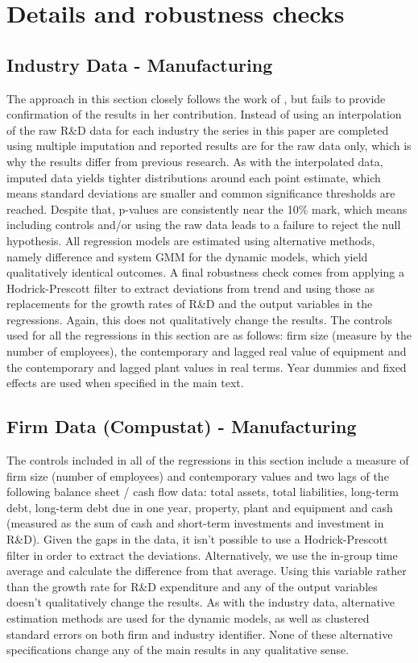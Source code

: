 \documentclass{_latex/house}
\begin{document}
\section{Details and robustness checks}
\subsection{Industry Data - Manufacturing}
The approach in this section closely follows the work of \cite{RePEc:tpr:restat:v:93:y:2011:i:2:p:542-553}, but fails to provide confirmation of the results in her contribution. Instead of using an interpolation of the raw R\&D data for each industry the series in this paper are completed using multiple imputation and reported results are for the raw data only, which is why the results differ from previous research. As with the interpolated data, imputed data yields tighter distributions around each point estimate, which means standard deviations are smaller and common significance thresholds are reached. Despite that, p-values are consistently near the 10\% mark, which means including controls and/or using the raw data leads to a failure to reject the null hypothesis. All regression models are estimated using alternative methods, namely difference and system GMM for the dynamic models, which yield qualitatively identical outcomes. A final robustness check comes from applying a Hodrick-Prescott filter to extract deviations from trend and using those as replacements for the growth rates of R\&D and the output variables in the regressions. Again, this does not qualitatively change the results. The controls used for all the regressions in this section are as follows: firm size (measure by the number of employees), the contemporary and lagged real value of equipment and the contemporary and lagged plant values in real terms. Year dummies and fixed effects are used when specified in the main text.
\subsection{Firm Data (Compustat) - Manufacturing}
The controls included in all of the regressions in this section include a measure of firm size (number of employees) and contemporary values and two lags of the following balance sheet / cash flow data: total assets, total liabilities, long-term debt, long-term debt due in one year, property, plant and equipment and cash (measured as the sum of cash and short-term investments and investment in R\&D). Given the gaps in the data, it isn't possible to use a Hodrick-Prescott filter in order to extract the deviations. Alternatively, we use the in-group time average and calculate the difference from that average. Using this variable rather than the growth rate for R\&D expenditure and any of the output variables doesn't qualitatively change the results. As with the industry data, alternative estimation methods are used for the dynamic models, as well as clustered standard errors on both firm and industry identifier. None of these alternative specifications change any of the main results in any qualitative sense.
\end{document}
